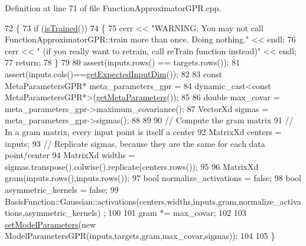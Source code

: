 Definition at line 71 of file Function\+Approximator\+G\+P\+R.\+cpp.


\begin{DoxyCode}
72 \{
73   \textcolor{keywordflow}{if} (\hyperlink{classDmpBbo_1_1FunctionApproximator_a178135f623d9b9058870851a53299c6e}{isTrained}())  
74   \{
75     cerr << \textcolor{stringliteral}{"WARNING: You may not call FunctionApproximatorGPR::train more than once. Doing nothing."} << 
      endl;
76     cerr << \textcolor{stringliteral}{"   (if you really want to retrain, call reTrain function instead)"} << endl;
77     \textcolor{keywordflow}{return};
78   \}
79   
80   assert(inputs.rows() == targets.rows());
81   assert(inputs.cols()==\hyperlink{classDmpBbo_1_1FunctionApproximator_af5a550bcf65d5a29a153a594cc4e3fa1}{getExpectedInputDim}());
82 
83   \textcolor{keyword}{const} MetaParametersGPR* meta\_parameters\_gpr = 
84     \textcolor{keyword}{dynamic\_cast<}\textcolor{keyword}{const }MetaParametersGPR*\textcolor{keyword}{>}(\hyperlink{classDmpBbo_1_1FunctionApproximator_a6f1a44062eac61d88b647c358bcda155}{getMetaParameters}());
85   
86   \textcolor{keywordtype}{double} max\_covar = meta\_parameters\_gpr->maximum\_covariance();
87   VectorXd sigmas = meta\_parameters\_gpr->sigmas();
88   
89   
90   \textcolor{comment}{// Compute the gram matrix}
91   \textcolor{comment}{// In a gram matrix, every input point is itself a center}
92   MatrixXd centers = inputs;
93   \textcolor{comment}{// Replicate sigmas, because they are the same for each data point/center}
94   MatrixXd widths = sigmas.transpose().colwise().replicate(centers.rows()); 
95 
96   MatrixXd gram(inputs.rows(),inputs.rows());
97   \textcolor{keywordtype}{bool} normalize\_activations = \textcolor{keyword}{false};
98   \textcolor{keywordtype}{bool} asymmetric\_kernels = \textcolor{keyword}{false};
99   BasisFunction::Gaussian::activations(centers,widths,inputs,gram,normalize\_activations,asymmetric\_kernels)
      ;
100   
101   gram *= max\_covar;
102 
103   \hyperlink{classDmpBbo_1_1FunctionApproximator_afd6f9d480456b90c4740c7aaca084ba4}{setModelParameters}(\textcolor{keyword}{new} ModelParametersGPR(inputs,targets,gram,max\_covar,sigmas));
104   
105 \}
\end{DoxyCode}


